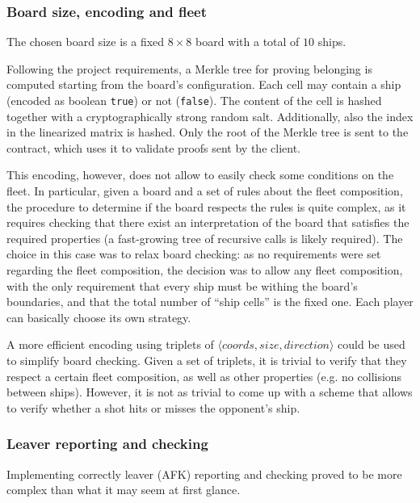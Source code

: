 \subsubsection{Board size, encoding and fleet}
\label{sec:implementation-contract-board}
The chosen board size is a fixed $8 \times 8$ board with a total of $10$ ships.

Following the project requirements, a Merkle tree for proving belonging is
computed starting from the board's configuration. Each cell may contain a ship
(encoded as boolean \texttt{true}) or not
(\texttt{false}). The content of the cell is hashed together with
a cryptographically strong random salt. Additionally, also the index in the
linearized matrix is hashed. Only the root of the Merkle tree is sent to the
contract, which uses it to validate proofs sent by the client.

This encoding, however, does not allow to easily check some conditions on the
fleet. In particular, given a board and a set of rules about the fleet
composition, the procedure to determine if the board respects the rules is
quite complex, as it requires checking that there exist an interpretation of
the board that satisfies the required properties (a fast-growing tree of
recursive calls is likely required). The choice in this case was to relax board
checking: as no requirements were set regarding the fleet composition, the
decision was to allow any fleet composition, with the only requirement that
every ship must be withing the board's boundaries, and that the total number of
``ship cells'' is the fixed one. Each player can basically choose its own
strategy.

A more efficient encoding using triplets of $\langle coords, size,
	direction\rangle$ could be used to simplify board checking. Given a set of
triplets, it is trivial to verify that they respect a certain fleet
composition, as well as other properties (e.g. no collisions between ships).
However, it is not as trivial to come up with a scheme that allows to verify
whether a shot hits or misses the opponent's ship.

\subsubsection{Leaver reporting and checking}
\label{sec:implementation-contract-leaver-reporting}
Implementing correctly leaver (AFK) reporting and checking proved to be more
complex than what it may seem at first glance.

